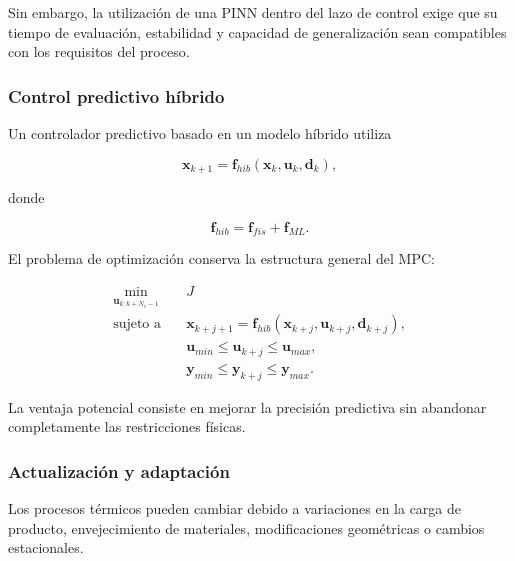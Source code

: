Sin embargo, la utilización de una PINN dentro del lazo de control exige que su tiempo de evaluación, estabilidad y capacidad de generalización sean compatibles con los requisitos del proceso.

\subsubsection{Control predictivo híbrido}

Un controlador predictivo basado en un modelo híbrido utiliza

\begin{equation}
\mathbf{x}_{k+1}
=
\mathbf{f}_{hib}
\left(
\mathbf{x}_k,
\mathbf{u}_k,
\mathbf{d}_k
\right),
\end{equation}

donde

\begin{equation}
\mathbf{f}_{hib}
=
\mathbf{f}_{fis}
+
\mathbf{f}_{ML}.
\end{equation}

El problema de optimización conserva la estructura general del MPC:

\begin{equation}
\begin{aligned}
\min_{\mathbf{u}_{k:k+N_c-1}}
\quad &
J
\\
\text{sujeto a}
\quad &
\mathbf{x}_{k+j+1}
=
\mathbf{f}_{hib}
\left(
\mathbf{x}_{k+j},
\mathbf{u}_{k+j},
\mathbf{d}_{k+j}
\right),
\\
&
\mathbf{u}_{min}
\leq
\mathbf{u}_{k+j}
\leq
\mathbf{u}_{max},
\\
&
\mathbf{y}_{min}
\leq
\mathbf{y}_{k+j}
\leq
\mathbf{y}_{max}.
\end{aligned}
\label{eq:mpc_hibrido}
\end{equation}

La ventaja potencial consiste en mejorar la precisión predictiva sin abandonar completamente las restricciones físicas.

\subsubsection{Actualización y adaptación}

Los procesos térmicos pueden cambiar debido a variaciones en la carga de producto, envejecimiento de materiales, modificaciones geométricas o cambios estacionales.

